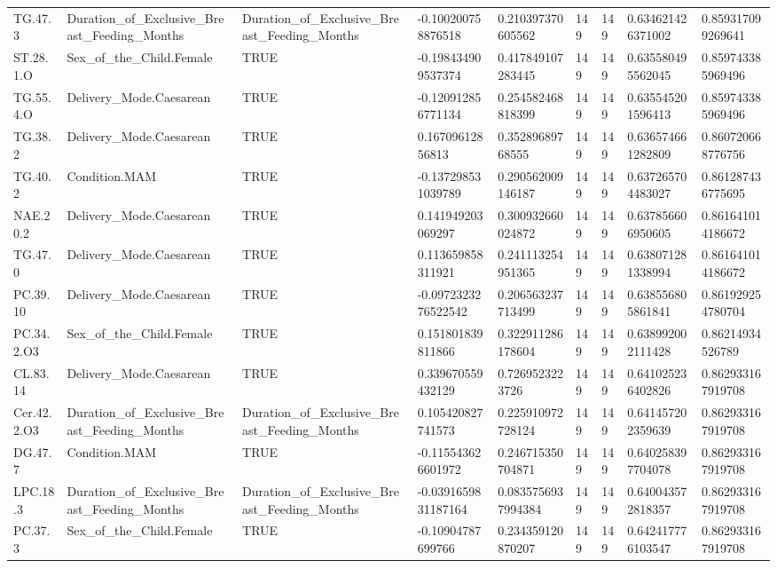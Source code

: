 \begin{longtable}{lllllllll}
TG.47.3 & Duration\_of\_Exclusive\_Breast\_Feeding\_Months & Duration\_of\_Exclusive\_Breast\_Feeding\_Months & -0.100200758876518 & 0.210397370605562 & 149 & 149 & 0.634621426371002 & 0.859317099269641 \\
ST.28.1.O & Sex\_of\_the\_Child.Female & TRUE & -0.198434909537374 & 0.417849107283445 & 149 & 149 & 0.635580495562045 & 0.859743385969496 \\
TG.55.4.O & Delivery\_Mode.Caesarean & TRUE & -0.120912856771134 & 0.254582468818399 & 149 & 149 & 0.635545201596413 & 0.859743385969496 \\
TG.38.2 & Delivery\_Mode.Caesarean & TRUE & 0.16709612856813 & 0.35289689768555 & 149 & 149 & 0.636574661282809 & 0.860720668776756 \\
TG.40.2 & Condition.MAM & TRUE & -0.137298531039789 & 0.290562009146187 & 149 & 149 & 0.637265704483027 & 0.861287436775695 \\
NAE.20.2 & Delivery\_Mode.Caesarean & TRUE & 0.141949203069297 & 0.300932660024872 & 149 & 149 & 0.637856606950605 & 0.861641014186672 \\
TG.47.0 & Delivery\_Mode.Caesarean & TRUE & 0.113659858311921 & 0.241113254951365 & 149 & 149 & 0.638071281338994 & 0.861641014186672 \\
PC.39.10 & Delivery\_Mode.Caesarean & TRUE & -0.0972323276522542 & 0.206563237713499 & 149 & 149 & 0.638556805861841 & 0.861929254780704 \\
PC.34.2.O3 & Sex\_of\_the\_Child.Female & TRUE & 0.151801839811866 & 0.322911286178604 & 149 & 149 & 0.638992002111428 & 0.86214934526789 \\
CL.83.14 & Delivery\_Mode.Caesarean & TRUE & 0.339670559432129 & 0.7269523223726 & 149 & 149 & 0.641025236402826 & 0.862933167919708 \\
Cer.42.2.O3 & Duration\_of\_Exclusive\_Breast\_Feeding\_Months & Duration\_of\_Exclusive\_Breast\_Feeding\_Months & 0.105420827741573 & 0.225910972728124 & 149 & 149 & 0.641457202359639 & 0.862933167919708 \\
DG.47.7 & Condition.MAM & TRUE & -0.115543626601972 & 0.246715350704871 & 149 & 149 & 0.640258397704078 & 0.862933167919708 \\
LPC.18.3 & Duration\_of\_Exclusive\_Breast\_Feeding\_Months & Duration\_of\_Exclusive\_Breast\_Feeding\_Months & -0.0391659831187164 & 0.0835756937994384 & 149 & 149 & 0.640043572818357 & 0.862933167919708 \\
PC.37.3 & Sex\_of\_the\_Child.Female & TRUE & -0.10904787699766 & 0.234359120870207 & 149 & 149 & 0.642417776103547 & 0.862933167919708 \\

\end{longtable}
